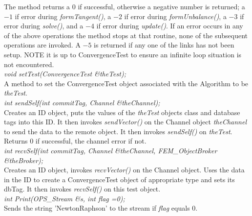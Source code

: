 \noindent The method returns a 0 if successful, otherwise a negative number is
returned; a $-1$ if error during {\em formTangent()}, a $-2$ if
error during {\em formUnbalance()}, a $-3$ if error during {\em
solve()}, and a $-4$ if error during {\em update()}.
If an error occurs in any of the above operations the method stops at
that routine, none of the subsequent operations are invoked. A $-5$ is
returned if any one of the links has not been setup. NOTE it is up to
ConvergenceTest to ensure an infinite loop situation is not encountered. \\

{\em void setTest(ConvergenceTest \&theTest);} \\
A method to set the ConvergenceTest object associated with the
Algorithm to be {\em theTest}. \\

{\em int sendSelf(int commitTag, Channel \&theChannel);}\\
Creates an ID object, puts the values of the {\em theTest} objects
class and database tags into this ID. It then invokes {\em
sendVector()} on the Channel object {\em theChannel} to send the data
to the remote object. It then invokes {\em sendSelf()} on {\em
theTest}. Returns $0$ if successful, the channel error if not. \\

{\em int recvSelf(int commitTag, Channel \&theChannel, FEM\_ObjectBroker
\&theBroker);}\\ 
Creates an ID object, invokes {\em recvVector()} on the Channel
object. Uses the data in the ID to create a ConvergenceTest object of
appropriate type and sets its dbTag. It then invokes {\em recvSelf()}
on this test object. \\

{\em int Print(OPS_Stream \&s, int flag =0);} \\
Sends the string 'NewtonRaphson' to the stream if {\em flag} equals $0$.